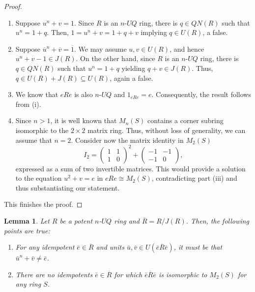 \documentclass[12pt]{amsart}
\newtheorem{lemma}[theorem]{Lemma}
\theoremstyle{definition}
\begin{document}
\begin{proof}
\begin{enumerate}
\item
Suppose $u^n + v = 1$. Since $R$ is an $n$-$UQ$ ring, there is $q \in QN(R)$ such that $u^n = 1 + q$. Then, $1 = u^n + v = 1 + q + v$ implying $q\in U(R)$, a false.
\item	
Suppose $\overline{u}^n + \overline{v} = \overline{1}$. We may assume $u, v \in U(R)$, and hence $u^n + v - 1 \in J(R)$. On the other hand, since $R$ is an $n$-$UQ$ ring, there is $q \in QN(R)$ such that $u^n = 1 + q$ yielding $q + v \in J(R)$. Thus, $q \in U(R) + J(R) \subseteq U(R)$, again a false.
\item	
We know that $eRe$ is also $n$-$UQ$ and $1_{eRe}=e$. Consequently, the result follows from (i).
\item	
Since $n>1$, it is well known that $M_n(S)$ contains a corner subring isomorphic to the $2 \times 2$ matrix ring.%
Thus, without loss of generality, we can assume that $n=2$. Consider now the matrix identity in $M_2(S)$
	\[
	I_2 = \begin{pmatrix} 1 & 1 \\ 1 & 0 \end{pmatrix}^2 + \begin{pmatrix} -1 & -1 \\ -1 & 0 \end{pmatrix},
	\]
expressed as a sum of two invertible matrices. This would provide a solution to the equation $u^2 + v = e$ in $eRe \cong M_2(S)$, contradicting part (iii) and thus substantiating our statement.
\end{enumerate}

This finishes the proof.
\end{proof}

\begin{lemma}\label{exe}
Let $R$ be a potent $n$-$UQ$ ring and $\overline{R} = R/J(R)$. Then, the following points are true:
\begin{enumerate}
\item
For any idempotent $\bar{e} \in \overline{R}$ and units $\bar{u}, \bar{v} \in U(\bar{e}\overline{R}\bar{e})$, it must be that $\bar{u}^n + \bar{v} \neq \bar{e}$.
\item	
There are no idempotents $\bar{e} \in \overline{R}$ for which $\bar{e}\overline{R}\bar{e}$ is isomorphic to $M_2(S)$ for any ring $S$.
\end{enumerate}
\end{lemma}
\end{document}
